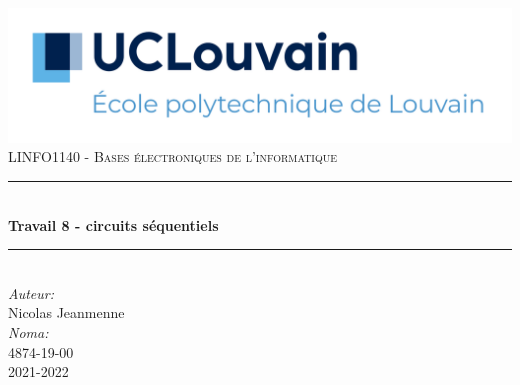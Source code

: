 \begin{titlepage}

    \newcommand{\HRule}{\rule{\linewidth}{0.5mm}} 							%
    \center 
     
    \includegraphics[width=\textwidth]{../pictures/UCLouvain-EPL.png}\\[1cm]
    
    \textsc{\large 
    LINFO1140 - Bases électroniques de l'informatique}\\[1cm] 										%
    \HRule \\[0.8cm]
    {\huge \bfseries Travail 8 - circuits séquentiels}\\[0.7cm]								%
    \HRule \\[2cm]
    \large
    \emph{Auteur:}\\
    Nicolas Jeanmenne\\[1.5cm]
    \emph{Noma:}\\
    4874-19-00\\[1.5cm]
    \vfill													%
    {\large 2021-2022}\\[5cm] 	%
    
    \vfill
\end{titlepage}